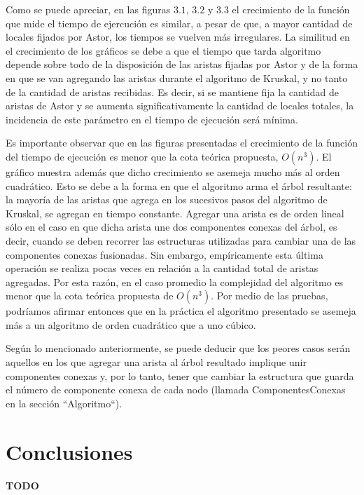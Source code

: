 \documentclass[a4paper,11pt] {article}
\begin{document}
Como se puede apreciar, en las figuras $3.1$, $3.2$ y $3.3$ el crecimiento de la funci\'on que mide el tiempo de ejercuci\'on es similar, a pesar de que, a mayor cantidad de locales fijados por Astor, los tiempos se vuelven m\'as irregulares. La similitud en el crecimiento de los gr\'aficos se debe a que el tiempo que tarda algoritmo depende sobre todo de la disposici\'on de las aristas fijadas por Astor y de la forma en que se van agregando las aristas durante el algoritmo de Kruskal, y no tanto de la cantidad de aristas recibidas. Es decir, si se mantiene fija la cantidad de aristas de Astor y se aumenta significativamente la cantidad de locales totales, la incidencia de este par\'ametro en el tiempo de ejecuci\'on ser\'a m\'inima.

Es importante observar que en las figuras presentadas el crecimiento de la funci\'on del tiempo de ejecuci\'on es menor que la cota te\'orica propuesta, $O(n^{3})$. El gr\'afico muestra adem\'as que dicho crecimiento se asemeja mucho m\'as al orden cuadr\'atico. Esto se debe a la forma en que el algoritmo arma el \'arbol resultante: la mayor\'ia de las aristas que agrega en los sucesivos pasos del algoritmo de Kruskal, se agregan en tiempo constante. Agregar una arista es de orden lineal s\'olo en el caso en que dicha arista une dos componentes conexas del \'arbol, es decir, cuando se deben recorrer las estructuras utilizadas para cambiar una de las componentes conexas fusionadas. Sin embargo, emp\'iricamente esta \'ultima operaci\'on  se realiza pocas veces en relaci\'on a la cantidad total de aristas agregadas. Por esta raz\'on, en el caso promedio la complejidad del algoritmo es menor que la cota te\'orica propuesta de $O(n^3)$. Por medio de las pruebas, podr\'iamos afirmar entonces que en la pr\'actica el algoritmo presentado se asemeja m\'as a un algoritmo de orden cuadr\'atico que a uno c\'ubico.

Seg\'un lo mencionado anteriormente, se puede deducir que los peores casos ser\'an aquellos en los que agregar una arista al \'arbol resultado implique unir componentes conexas y, por lo tanto, tener que cambiar la estructura que guarda el n\'umero de componente conexa de cada nodo (llamada ComponentesConexas en la secci\'on ``Algoritmo``).

\section*{Conclusiones}

\textbf{TODO}
\end{document}
